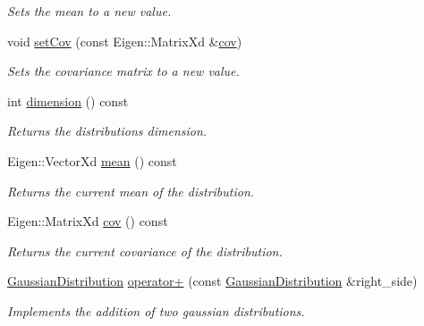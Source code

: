 \begin{DoxyCompactItemize}
\begin{DoxyCompactList}\small\item\em Sets the mean to a new value. \end{DoxyCompactList}\item 
void \hyperlink{classrefill_1_1GaussianDistribution_a48c5b06da04fef675dc044a0dabe6d86}{set\+Cov} (const Eigen\+::\+Matrix\+Xd \&\hyperlink{classrefill_1_1GaussianDistribution_a45f96d0d4d5bd8da390c54b5126e4072}{cov})
\begin{DoxyCompactList}\small\item\em Sets the covariance matrix to a new value. \end{DoxyCompactList}\item 
int \hyperlink{classrefill_1_1GaussianDistribution_a43b275170074ef7ef38d93fb4f3e1e5a}{dimension} () const 
\begin{DoxyCompactList}\small\item\em Returns the distributions dimension. \end{DoxyCompactList}\item 
Eigen\+::\+Vector\+Xd \hyperlink{classrefill_1_1GaussianDistribution_aa7c74dd2350c3f56877ab759cb68ba8b}{mean} () const 
\begin{DoxyCompactList}\small\item\em Returns the current mean of the distribution. \end{DoxyCompactList}\item 
Eigen\+::\+Matrix\+Xd \hyperlink{classrefill_1_1GaussianDistribution_a45f96d0d4d5bd8da390c54b5126e4072}{cov} () const 
\begin{DoxyCompactList}\small\item\em Returns the current covariance of the distribution. \end{DoxyCompactList}\item 
\hyperlink{classrefill_1_1GaussianDistribution}{Gaussian\+Distribution} \hyperlink{classrefill_1_1GaussianDistribution_aabe6056cbb9a22595e7b3b493c4f3951}{operator+} (const \hyperlink{classrefill_1_1GaussianDistribution}{Gaussian\+Distribution} \&right\+\_\+side)
\begin{DoxyCompactList}\small\item\em Implements the addition of two gaussian distributions. \end{DoxyCompactList}\end{DoxyCompactItemize}
